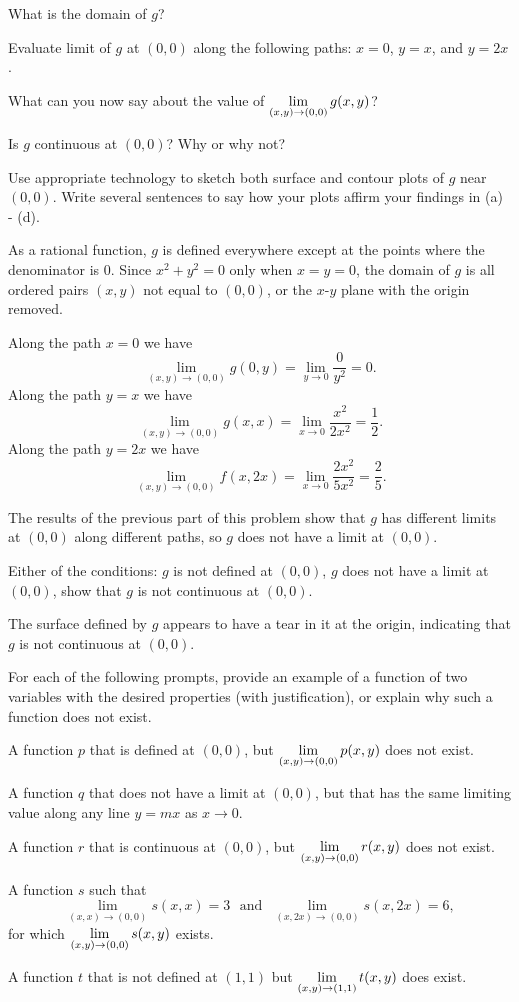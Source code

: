 \begin{exercises}
    \ba
   	\item What is the domain of $g$?
	\item Evaluate limit of $g$ at $(0,0)$ along the following paths:  $x = 0$, $y = x$, and $y = 2x$.
	\item What can you now say about the value of $\displaystyle \lim_{(x,y) \to (0,0)} g(x,y)$?
	\item Is $g$ continuous at $(0,0)$?  Why or why not?
	\item Use appropriate technology to sketch both surface and contour plots of $g$ near $(0,0)$.  Write several sentences to say how your plots affirm your findings in (a) - (d).
    \ea

\begin{exerciseSolution}
    \ba
   	\item As a rational function, $g$ is defined everywhere except at the points where the denominator is 0. Since $x^2 + y^2  = 0$ only when $x=y=0$, the domain of $g$ is all ordered pairs $(x,y)$ not equal to $(0,0)$, or the $x$-$y$ plane with the origin removed. 
	\item Along the path $x=0$ we have 
\[\lim_{(x,y) \to (0,0)} g(0,y) = \lim_{y \to 0} \frac{0}{y^2} = 0.\]
Along the path $y=x$ we have 
\[\lim_{(x,y) \to (0,0)} g(x,x) = \lim_{x \to 0} \frac{x^2}{2x^2} = \frac{1}{2}.\]
Along the path $y=2x$ we have 
\[\lim_{(x,y) \to (0,0)} f(x,2x) = \lim_{x \to 0} \frac{2x^2}{5x^2} = \frac{2}{5}.\]
	\item The results of the previous part of this problem show that $g$ has different limits at $(0,0)$ along different paths, so $g$ does not have a limit at $(0,0)$.
	\item Either of the conditions: $g$ is not defined at $(0,0)$, $g$ does not have a limit at $(0,0)$, show that $g$ is not continuous at $(0,0)$. 
	\item The surface defined by $g$ appears to have a tear in it at the origin, indicating that $g$ is not continuous at $(0,0)$. 
    \ea
\end{exerciseSolution}


\item \label{Ez:10.1.3}  For each of the following prompts, provide an example of a function of two variables with the desired properties (with justification), or explain why such a function does not exist.
				
    \ba
   	\item A function $p$ that is defined at $(0,0)$, but $\displaystyle \lim_{(x,y) \to (0,0)} p(x,y)$ does not exist.
	\item A function $q$ that does not have a limit at $(0,0)$, but that has the same limiting value along any line $y = mx$ as $x \to 0$.
	\item A function $r$ that is continuous at $(0,0)$, but $\displaystyle \lim_{(x,y) \to (0,0)} r(x,y)$ does not exist.
	\item A function $s$ such that 
	$$\lim_{(x,x) \to (0,0)} s(x,x) = 3 \ \ \ \mbox{and} \ \ \ \lim_{(x,2x) \to (0,0)} s(x,2x) = 6,$$
	for which  $\displaystyle \lim_{(x,y) \to (0,0)} s(x,y)$ exists.
	\item A function $t$ that is not defined at $(1,1)$ but $\displaystyle \lim_{(x,y) \to (1,1)} t(x,y)$ does exist.
    \ea


\end{exercises}
